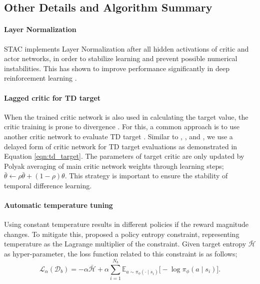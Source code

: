 \documentclass[10pt]{article} %
\begin{document}
\subsection{Other Details and Algorithm Summary}

\paragraph{Layer Normalization} 
STAC implements Layer Normalization \citep{ba2016layer} after all hidden activations of critic and actor networks, in order to stabilize learning and prevent possible numerical instabilities. This has shown to improve performance significantly in deep reinforcement learning \citep{nauman2024overestimation, hiraoka2021dropout}. 

\paragraph{Lagged critic for TD target}
When the trained critic network is also used in calculating the target value, the critic training is prone to divergence \citep{li2023realistic}. For this, a common approach is to use another critic network to evaluate TD target \citep{mnih2013playing}. Similar to \citet{lillicrap2015continuous}, \citet{fujimoto2018addressing}, and \citet{haarnoja2018soft}, we use a delayed form of critic network for TD target evaluations as demonstrated in Equation \ref{eqn:td_target}. The parameters of target critic are only updated by Polyak averaging of main critic network weights through learning steps; $\bar{\theta} \leftarrow \rho \bar{\theta} + (1-\rho) \theta $. This strategy is important to ensure the stability of temporal difference learning. 

\paragraph{Automatic temperature tuning} Using constant temperature results in different policies if the reward magnitude changes. To mitigate this, \citet{haarnoja2018soft} proposed a policy entropy constraint, representing temperature as the Lagrange multiplier of the constraint. Given target entropy $\mathcal{\bar{H}}$ as hyper-parameter, the loss function related to this constraint is as follows;  
\begin{equation}
	\mathcal{L}_{\alpha}(\mathcal{D}_b) = - \alpha \mathcal{\bar{H}} + \alpha \sum_{i=1}^{N_b} \mathbb{E}_{a\sim\pi_{\phi}(\cdot \mid s_i)} \big[ -\log \pi_{\phi}(a \mid s_i) \big].  
\end{equation} 
\end{document}
